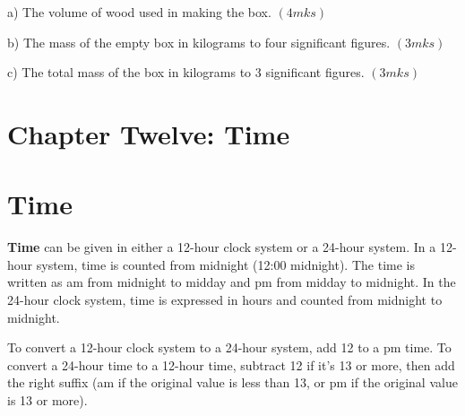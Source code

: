 \documentclass[
  letterpaper,
  DIV=11,
  numbers=noendperiod]{scrreprt}
\begin{document}
\begin{tcolorbox}
\begin{enumerate}
  a) The volume of wood used in making the box. \hspace{6cm} \((4mks)\)

  b) The mass of the empty box in kilograms to four significant figures.
  \hspace{3cm}\((3mks)\)

  c) The total mass of the box in kilograms to 3 significant figures.
  \hspace{3.8cm}\((3mks)\)
\end{enumerate}

\end{tcolorbox}


\hypertarget{chapter-twelve-time}{%
\chapter{Chapter Twelve: Time}\label{chapter-twelve-time}}


\hypertarget{time}{%
\chapter*{Time}\label{time}}


\textbf{Time} can be given in either a 12-hour clock system or a 24-hour
system. In a 12-hour system, time is counted from midnight (12:00
midnight). The time is written as am from midnight to midday and pm from
midday to midnight. In the 24-hour clock system, time is expressed in
hours and counted from midnight to midnight.

To convert a 12-hour clock system to a 24-hour system, add 12 to a pm
time. To convert a 24-hour time to a 12-hour time, subtract 12 if it's
13 or more, then add the right suffix (am if the original value is less
than 13, or pm if the original value is 13 or more).
\end{document}
